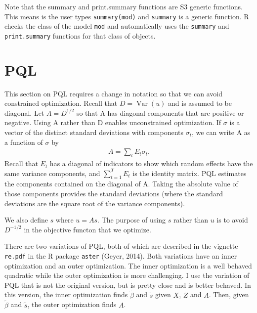\documentclass{article}
\DeclareMathOperator{\var}{Var}
\begin{document}

Note that the summary and print.summary functions are S3 generic functions.  This means is the user  types \texttt{summary(mod)} and \texttt{summary} is a generic function. R checks the class of the model \texttt{mod} and  automatically uses the \texttt{summary} and \texttt{print.summary} functions for that class of objects. 




\section{PQL}\label{sec:pql}
 This section on PQL requires a change in notation so that we can avoid constrained optimization.  Recall that $D=\var(u)$ and is assumed to be diagonal. Let $A=D^{1/2}$ so that A has diagonal components that are positive or negative. Using A rather than D enables unconstrained optimization.  If $\sigma$ is a vector of the distinct standard deviations with components $\sigma_t$, we can write A as a function of $\sigma$ by
\begin{align*}
A= \sum_t E_t \sigma_t.
\end{align*}
Recall that $E_t$ has a diagonal of indicators to show which random effects have the same variance components, and $\sum_{t=1}^T E_t$ is the identity matrix. PQL  estimates the components contained on the diagonal of A. Taking the absolute value of those components  provides the standard deviations (where the standard deviations are the square root of the variance components).

We also define $s$ where $u=As$. The purpose of using $s$ rather than $u$ is to avoid $D^{-1/2}$ in the objective functon that we optimize.


There are two variations of PQL, both of which are described in the vignette
 \texttt{re.pdf} in the R package \texttt{aster} (Geyer, 2014). Both variations have an inner optimization and an outer optimization. The inner optimization is a well behaved quadratic while the outer optimization is more challenging. I use the variation of PQL that is not the original version, but is pretty close and is better behaved.  In this version, the inner optimization finds $\tilde{\beta}$ and $\tilde{s}$ given $X$, $Z$ and $A$. Then, given $\tilde{\beta}$ and $\tilde{s}$, the outer optimization finds $A$.
\end{document}
